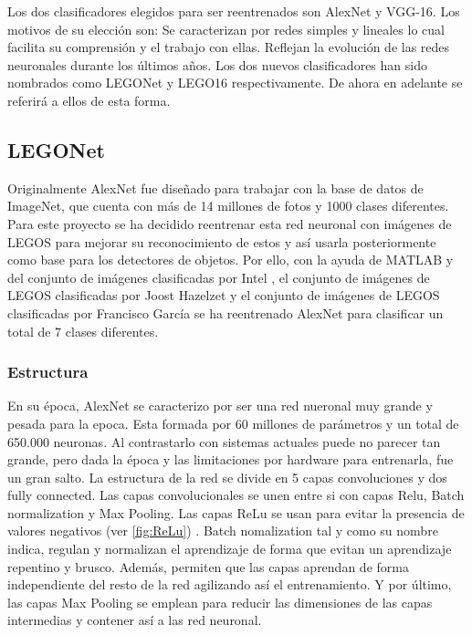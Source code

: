 Los dos clasificadores elegidos para ser reentrenados son AlexNet y VGG-16. Los motivos de su elección son: Se caracterizan por redes simples y lineales lo cual facilita su comprensión y el trabajo con ellas. Reflejan la evolución de las redes neuronales durante los últimos años. Los dos nuevos clasificadores han sido nombrados como LEGONet y LEGO16 respectivamente. De ahora en adelante se referirá a ellos de esta forma.

\subsection{LEGONet}
Originalmente AlexNet fue diseñado para trabajar con la base de datos de ImageNet, que cuenta con más de 14 millones de fotos y 1000 clases diferentes. Para este proyecto se ha decidido reentrenar esta red neuronal con imágenes de LEGOS para mejorar su reconocimiento de estos y así usarla posteriormente como base para los detectores de objetos. Por ello, con la ayuda de MATLAB y del conjunto de imágenes clasificadas por Intel \citep{IntelDataset}, el conjunto de imágenes de LEGOS clasificadas por Joost Hazelzet \citep{LEGODataset} y el conjunto de imágenes de LEGOS clasificadas por Francisco García \citep{LEGODataset2} se ha reentrenado AlexNet para clasificar un total de 7 clases diferentes.

\subsubsection*{Estructura}
En su época, AlexNet se caracterizo por ser una red nueronal muy grande y pesada para la epoca. Esta formada por 60 millones de parámetros y un total de 650.000 neuronas. Al contrastarlo con sistemas actuales puede no parecer tan grande, pero dada la época y las limitaciones por hardware para entrenarla, fue un gran salto. La estructura de la red se divide en 5 capas convoluciones y dos fully connected. Las capas convolucionales se unen entre si con capas Relu, Batch normalization y Max Pooling. Las capas ReLu se usan para evitar la presencia de valores negativos (ver \autoref{fig:ReLu}) \citep{ReLu}. Batch nomalization tal y como su nombre indica, regulan  y normalizan el aprendizaje de forma que evitan un aprendizaje repentino y brusco. Además, permiten que las capas aprendan de forma independiente del resto de la red agilizando así el entrenamiento. Y por último, las capas Max Pooling se emplean para reducir las dimensiones de las capas intermedias y contener así a las red neuronal.

